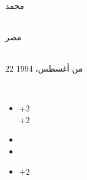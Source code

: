 \begin{titlebox}[title=معلومات شخصية]\renewcommand{\descriptionlabel}[1]{\color{blue} #1}%
\begin{description}[nosep,leftmargin=1.2em]%
\raggedleft\small%
\item[الاسم بالكامل:]\mbox{}\\ محمد 
\item[محل الميلاد:]\mbox{}\\  مصر
\item[تاريخ الميلاد:]\mbox{}\\22 من أغسطس، 1994
\item[للتواصل:]\mbox{}\\
\begin{itemize}[nosep,align=right,labelwidth=1.2em,labelsep=0.4em,leftmargin=1.6em]
	\item[\color{black}\faMobile*] \textenglish{+2 } \\ \textenglish{+2 }
	\item[\faGoogle] 
	\item[\color{blue}\faLinkedin]  
	\item[\color{green!50!black}\faWhatsapp] {+2 }
\end{itemize}
\end{description}
\end{titlebox}

